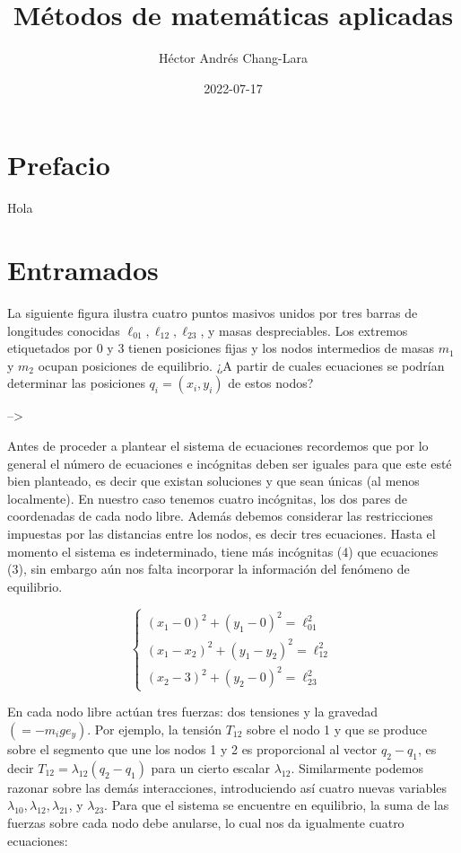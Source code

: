 \documentclass[
]{book}
\title{Métodos de matemáticas aplicadas}
\author{Héctor Andrés Chang-Lara}
\date{2022-07-17}
\theoremstyle{definition}
\theoremstyle{definition}
\theoremstyle{definition}
\theoremstyle{definition}
\theoremstyle{remark}
\begin{document}
\maketitle

{
\setcounter{tocdepth}{1}
\tableofcontents
}
\hypertarget{prefacio}{%
\chapter*{Prefacio}\label{prefacio}}

Hola

\hypertarget{entramados}{%
\chapter{Entramados}\label{entramados}}

La siguiente figura ilustra cuatro puntos masivos unidos por tres barras de longitudes conocidas \(\ell_{01}, \ell_{12}, \ell_{23}\), y masas despreciables. Los extremos etiquetados por \(0\) y \(3\) tienen posiciones fijas y los nodos intermedios de masas \(m_1\) y \(m_2\) ocupan posiciones de equilibrio. ¿A partir de cuales ecuaciones se podrían determinar las posiciones \(q_i=(x_i,y_i)\) de estos nodos?

--\textgreater{}

Antes de proceder a plantear el sistema de ecuaciones recordemos que por lo general el número de ecuaciones e incógnitas deben ser iguales para que este esté bien planteado, es decir que existan soluciones y que sean únicas (al menos localmente). En nuestro caso tenemos cuatro incógnitas, los dos pares de coordenadas de cada nodo libre. Además debemos considerar las restricciones impuestas por las distancias entre los nodos, es decir tres ecuaciones. Hasta el momento el sistema es indeterminado, tiene más incógnitas (4) que ecuaciones (3), sin embargo aún nos falta incorporar la información del fenómeno de equilibrio.

\[
\begin{cases}
(x_1-0)^2 + (y_1-0)^2 = \ell_{01}^2\\
(x_1-x_2)^2 + (y_1-y_2)^2 = \ell_{12}^2\\
(x_2-3)^2 + (y_2-0)^2 = \ell_{23}^2
\end{cases}
\]

En cada nodo libre actúan tres fuerzas: dos tensiones y la gravedad \((= -m_ige_y)\). Por ejemplo, la tensión \(T_{12}\) sobre el nodo 1 y que se produce sobre el segmento que une los nodos 1 y 2 es proporcional al vector \(q_2-q_1\), es decir \(T_{12} = \lambda_{12} (q_2-q_1)\) para un cierto escalar \(\lambda_{12}\). Similarmente podemos razonar sobre las demás interacciones, introduciendo así cuatro nuevas variables \(\lambda_{10}, \lambda_{12}, \lambda_{21}\), y \(\lambda_{23}\). Para que el sistema se encuentre en equilibrio, la suma de las fuerzas sobre cada nodo debe anularse, lo cual nos da igualmente cuatro ecuaciones:
\end{document}
